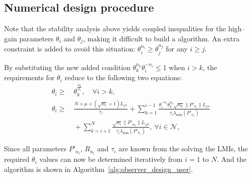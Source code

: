 \documentclass{ifacconf}
\begin{document}
\subsection{Numerical design procedure}
\vspace*{-0.3cm}
Note that the stability analysis above yields coupled inequalities for the high--gain parameters $\theta_i$ and $\theta_j$, making it difficult to build a algorithm. An extra constraint is added to avoid this situation: $\theta_i^{n_i} \ge \theta_j^{n_j}$ for any $i\ge j$.

By substituting the new added condition $\theta_k^{n_k}\theta_i^{-n_i} \le 1$ when $i>k$, the requirements for $\theta_i$ reduce to the following two equations:
\begin{subequations}
\begin{align}
\theta_i \ge&\ \theta_k^{\frac{n_k}{n_i}}, \quad \forall i>k, \label{eq:theta_iteration_extra} \\
\theta_i \ge&\ \frac{N+\mu+(\sqrt{n_i}+1)L_{\varphi i}}{\tau_i} + \sum^{i-1}_{k=1}\frac{\theta_i^{-n_i}\theta_k^{n_k}\sqrt{n_k}\|P'_{n_i}\|L_{\varphi i}}{\tau_i\lambda_{\min}(P'_{n_i})}\nonumber\\
&\ +\sum^N_{k=i+1} \frac{\sqrt{n_i}\|P'_{n_k}\|L_{\varphi k}}{\tau_i\lambda_{\min}(P'_{n_i})},\ \forall i\in\mathcal{N}, \label{eq:theta_iteration}
\end{align}
\end{subequations}

Since all parameters $P'_{n_i}$, $R_{n_i}$ and $\tau_i$ are known from the solving the LMIs, the required $\theta_i$ values can now be determined iteratively from $i=1$ to $N$. And the algorithm is shown in Algorithm~\ref{alg:observer_design_user}.
\end{document}
